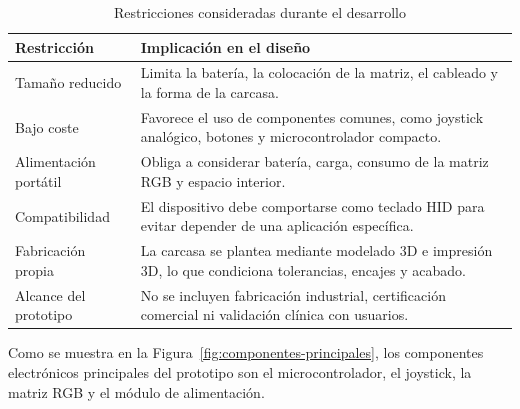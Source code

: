\begin{table}[H]
    \centering
    \caption{Restricciones consideradas durante el desarrollo}
    \label{tab:restricciones-proyecto}
    \begin{tabularx}{\textwidth}{@{}p{}X@{}}
        \toprule
        \textbf{Restricción} & \textbf{Implicación en el diseño} \\
        \midrule
        Tamaño reducido & Limita la batería, la colocación de la matriz, el cableado y la forma de la carcasa. \\
        Bajo coste & Favorece el uso de componentes comunes, como joystick analógico, botones y microcontrolador compacto. \\
        Alimentación portátil & Obliga a considerar batería, carga, consumo de la matriz RGB y espacio interior. \\
        Compatibilidad & El dispositivo debe comportarse como teclado HID para evitar depender de una aplicación específica. \\
        Fabricación propia & La carcasa se plantea mediante modelado 3D e impresión 3D, lo que condiciona tolerancias, encajes y acabado. \\
        Alcance del prototipo & No se incluyen fabricación industrial, certificación comercial ni validación clínica con usuarios. \\
        \bottomrule
    \end{tabularx}
\end{table}

Como se muestra en la Figura~\ref{fig:componentes-principales}, los componentes electrónicos principales del prototipo son el microcontrolador, el joystick, la matriz RGB y el módulo de alimentación.


